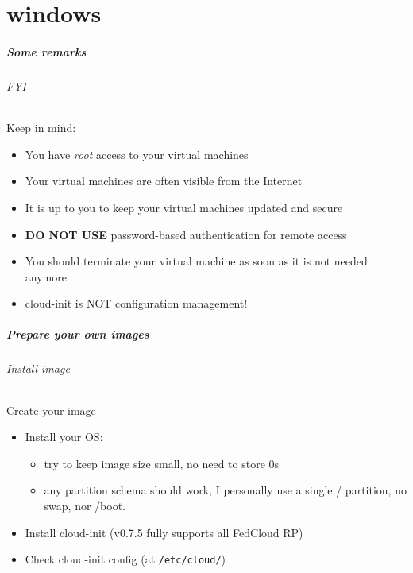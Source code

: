 \part{windows}

\begin{frame}
  \frametitle{Some remarks}
  \framesubtitle{FYI}

  Keep in mind:
  \begin{itemize}
    \item You have \textit{root} access to your virtual machines
    \item Your virtual machines are often visible from the Internet
    \item It is up to you to keep your virtual machines updated and secure
    \item \textbf{DO NOT USE} password-based authentication for remote access
    \item You should terminate your virtual machine as soon as it is not
          needed anymore
    \item cloud-init is NOT configuration management!
  \end{itemize}

\end{frame}


\begin{frame}
  \frametitle{Prepare your own images}
  \framesubtitle{Install image}
    
  \begin{block}{Create your image}
    \begin{itemize}
        \item Install your OS:
        \begin{itemize}
            \item try to keep image size small, no need to store 0s
            \item any partition schema should work, I personally use a
                single / partition, no swap, nor /boot.
        \end{itemize}
        \item Install cloud-init (v0.7.5 fully supports all FedCloud RP)
        \item Check cloud-init config (at \texttt{/etc/cloud/}) 
    \end{itemize}
  \end{block}

\end{frame}


